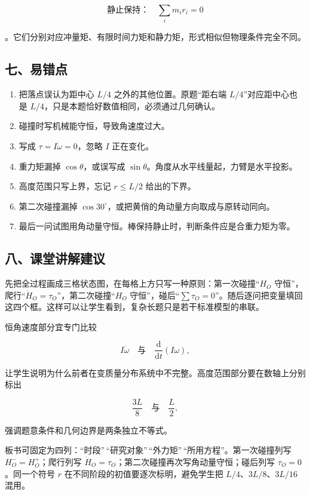 \documentclass[12pt,a4paper,UTF8]{ctexart}
\newcommand{\tightlist}{\setlength{\itemsep}{0pt}\setlength{\parskip}{0pt}}
\begin{document}
\[
\text{静止保持：}\quad \sum_i m_i r_i=0
\]

。它们分别对应冲量矩、有限时间力矩和静力矩，形式相似但物理条件完全不同。

\subsection{七、易错点}\label{ux4e03ux6613ux9519ux70b9}

\begin{enumerate}
\def\labelenumi{\arabic{enumi}.}
\tightlist
\item
  把落点误认为距中心 \(L/4\) 之外的其他位置。原题``距右端
  \(L/4\)''对应距中心也是
  \(L/4\)，只是本题恰好数值相同，必须通过几何确认。
\item
  碰撞时写机械能守恒，导致角速度过大。
\item
  写成 \(\tau=I\dot\omega=0\)，忽略 \(I\) 正在变化。
\item
  重力矩漏掉 \(\cos\theta\)，或误写成
  \(\sin\theta\)。角度从水平线量起，力臂是水平投影。
\item
  高度范围只写上界，忘记 \(r\le L/2\) 给出的下界。
\item
  第二次碰撞漏掉
  \(\cos30^\circ\)，或把黄俏的角动量方向取成与原转动同向。
\item
  最后一问试图用角动量守恒。棒保持静止时，判断条件应是合重力矩为零。
\end{enumerate}

\subsection{八、课堂讲解建议}\label{ux516bux8bfeux5802ux8bb2ux89e3ux5efaux8bae}

先把全过程画成三格状态图，在每格上方只写一种原则：第一次碰撞``\(H_O\)
守恒''，爬行``\(\dot H_O=\tau_O\)''，第二次碰撞``\(H_O\)
守恒''，碰后``\(\sum\tau_O=0\)''。随后逐问把变量填回这四个框。这样可以让学生看到，复杂长题只是若干标准模型的串联。

恒角速度部分宜专门比较

\[I\dot\omega\quad\text{与}\quad\frac{\mathrm d}{\mathrm dt}(I\omega),\]

让学生说明为什么前者在变质量分布系统中不完整。高度范围部分要在数轴上分别标出

\[\frac{3L}{8}\quad\text{与}\quad\frac L2,\]

强调题意条件和几何边界是两条独立不等式。

板书可固定为四列：``时段''\,``研究对象''\,``外力矩''\,``所用方程''。第一次碰撞列写
\(H_O^-=H_O^+\)；爬行列写
\(\dot H_O=\tau_O\)；第二次碰撞再次写角动量守恒；碰后列写
\(\tau_O=0\)。同一个符号 \(r\) 在不同阶段的初值要逐次标明，避免学生把
\(L/4\)、\(3L/8\)、\(3L/16\) 混用。
\end{document}
